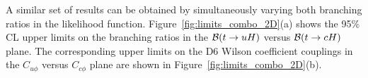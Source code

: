 \documentclass[PAPER, coverpage, atlasdraft=true, texlive=2016, UKenglish]{\ATLASLATEXPATH atlasdoc}
\begin{document}
A similar set of results can be obtained by simultaneously varying both branching ratios in the likelihood function.
Figure~\ref{fig:limits_combo_2D}(a) shows the 95\% CL upper limits on the branching ratios in the $\mathcal{B}(t\to uH)$ versus $\mathcal{B}(t\to cH)$ plane. 
The corresponding upper limits on the D6 Wilson coefficient couplings in the $C_{u\phi}$ versus $C_{c\phi}$ plane are shown in Figure~\ref{fig:limits_combo_2D}(b).
\end{document}
